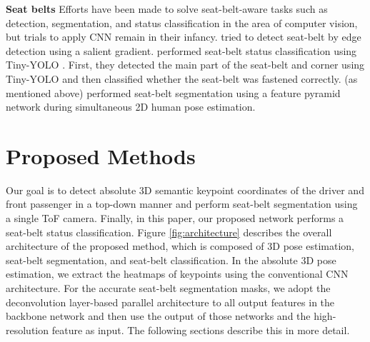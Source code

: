 \documentclass[letterpaper]{article} %
\begin{document}
\textbf{Seat belts} Efforts have been made to solve seat-belt-aware tasks such as detection, segmentation, and status classification in the area of computer vision, but trials to apply CNN remain in their infancy. \cite{zhou2017learning} tried to detect seat-belt by edge detection using a salient gradient. \cite{kashevnik2020seat} performed seat-belt status classification using Tiny-YOLO \cite{redmon2016you}. First, they detected the main part of the seat-belt and corner using Tiny-YOLO and then classified whether the seat-belt was fastened correctly. \cite{chun2019nads} (as mentioned above) performed seat-belt segmentation using a feature pyramid network during simultaneous 2D human pose estimation.


\section{Proposed Methods}
Our goal is to detect absolute 3D semantic keypoint coordinates of the driver and front passenger in a top-down manner and perform seat-belt segmentation using a single ToF camera. Finally, in this paper, our proposed network performs a seat-belt status classification. Figure \ref{fig:architecture} describes the overall architecture of the proposed method, which is composed of 3D pose estimation, seat-belt segmentation, and seat-belt classification. In the absolute 3D pose estimation, we extract the heatmaps of keypoints using the conventional CNN architecture. For the accurate seat-belt segmentation masks, we adopt the deconvolution layer-based parallel architecture to all output features in the backbone network and then use the output of those networks and the high-resolution feature as input. The following sections describe this in more detail.

\begin{table}[t]
\centering
{}
\caption{Subject statistics.}
\label{tab:statistics}
\end{table}
\end{document}
